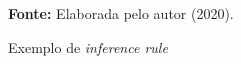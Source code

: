 \begin{figure}[ht!]
\centering

\caption{\textmd{Exemplo de \textit{inference rule}}}
\label{fig:inferencerule}

\par\medskip\textbf{Fonte:} Elaborada pelo autor (2020). \par\medskip

\end{figure}
